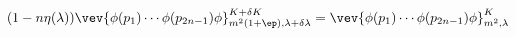\begin{equation}
(1 - n \eta (\lambda)) \vev{ \phi (p_1) \cdots \phi (p_{2n-1}) \phi
}^{K+\delta K}_{m^2 (1+\ep),\lambda + \delta \lambda} = \vev{ \phi
(p_1) \cdots \phi (p_{2n-1}) \phi }^K_{m^2, \lambda}
\label{equivalence}
\end{equation}

